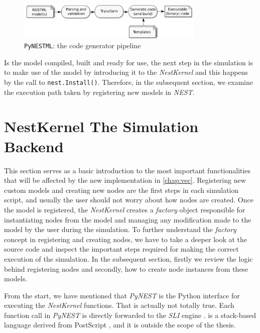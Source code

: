 \begin{figure}[h!]
\centering
\includegraphics[width=0.8\textwidth]{src/pic/internal_workflow.png}
\caption{\texttt{PyNESTML}: the code generator pipeline}
\label{fig:pynestml_workflow}
\end{figure}



Is the model compiled, built and ready for use, the next step in the simulation is to make use of the model by introducing it to the \emph{NestKernel} and this happens by the call to \texttt{nest.Install()}. Therefore, in the subsequent section, we examine the execution path taken by registering new models in \emph{NEST}.

\section{NestKernel The Simulation Backend}


This section serves as a basic introduction to the most important functionalities that will be affected by the new implementation in \autoref{chap:vec}. Registering new custom models and creating new nodes are the first steps in each simulation script, and usually the user should not worry about how nodes are created. Once the model is registered, the \emph{NestKernel} creates a \emph{factory} object responsible for instantiating nodes from the model and managing any modification made to the model by the user during the simulation. To further understand the \emph{factory} concept in registering and creating nodes, we have to take a deeper look at the source code and inspect the important steps required for making the correct execution of the simulation. In the subsequent section, firstly we review the logic behind registering nodes and secondly, how to create node instances from these models.

From the start, we have mentioned that \emph{PyNEST} is the Python interface for executing the \emph{NestKernel} functions. That is actually not totally true. Each function call in \emph{PyNEST} is directly forwarded to the \emph{SLI} engine \cite{gewaltig2007nest}.  is a stack-based language derived from PostScript \cite{adobe1990postscript}, and it is outside the scope of the thesis.

